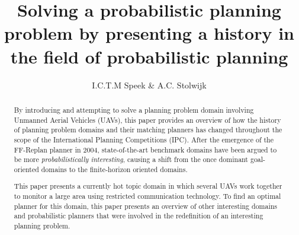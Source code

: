 \documentclass[runningheads,a4paper]{llncs}
\begin{document}
\mainmatter%

\title{Solving a probabilistic planning problem by presenting a history in the field of probabilistic planning}


\author{I.C.T.M Speek \& A.C. Stolwijk}

%



\maketitle



\begin{abstract}
By introducing and attempting to solve a planning problem domain involving Unmanned Aerial Vehicles (UAVs), this paper provides an overview of how the history of planning problem domains and their matching planners has changed throughout the scope of the International Planning Competitions (IPC). After the emergence of the FF-Replan planner in 2004, state-of-the-art benchmark domains have been argued to be more \emph{probabilistically interesting}, causing a shift from the once dominant goal-oriented domains to the finite-horizon oriented domains.

This paper presents a currently hot topic domain in which several UAVs work together to monitor a large area using restricted communication technology. To find an optimal planner for this domain, this paper presents an overview of other interesting domains and probabilistic planners that were involved in the redefinition of an interesting planning problem.

\end{abstract}
\end{document}
